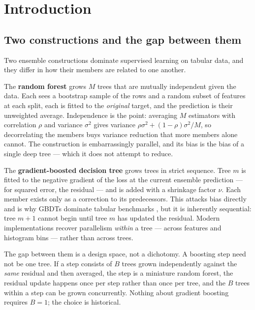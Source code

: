 \documentclass[11pt,a4paper]{article}
\theoremstyle{definition}
\begin{document}
\tableofcontents

\newpage

\section{Introduction}

\subsection{Two constructions and the gap between them}

Two ensemble constructions dominate supervised learning on tabular data, and
they differ in how their members are related to one another.

The \textbf{random forest} \cite{breiman2001rf} grows $M$ trees that are
mutually independent given the data. Each sees a bootstrap sample of the rows
and a random subset of features at each split, each is fitted to the
\emph{original} target, and the prediction is their unweighted average.
Independence is the point: averaging $M$ estimators with correlation $\rho$ and
variance $\sigma^2$ gives variance $\rho\sigma^2 + (1-\rho)\sigma^2/M$, so
decorrelating the members buys variance reduction that more members alone
cannot. The construction is embarrassingly parallel, and its bias is the bias
of a single deep tree --- which it does not attempt to reduce.

The \textbf{gradient-boosted decision tree} \cite{friedman2001gbm} grows trees
in strict sequence. Tree $m$ is fitted to the negative gradient of the loss at
the current ensemble prediction --- for squared error, the residual --- and is
added with a shrinkage factor $\nu$. Each member exists only as a correction to
its predecessors. This attacks bias directly and is why GBDTs dominate tabular
benchmarks \cite{grinsztajn2022}, but it is inherently sequential: tree $m{+}1$
cannot begin until tree $m$ has updated the residual. Modern implementations
\cite{ke2017lightgbm,chen2016xgboost} recover parallelism \emph{within} a tree
--- across features and histogram bins --- rather than across trees.

The gap between them is a design space, not a dichotomy. A boosting step need
not be one tree. If a step consists of $B$ trees grown independently against
the \emph{same} residual and then averaged, the step is a miniature random
forest, the residual update happens once per step rather than once per tree,
and the $B$ trees within a step can be grown concurrently. Nothing about
gradient boosting requires $B=1$; the choice is historical.
\end{document}
